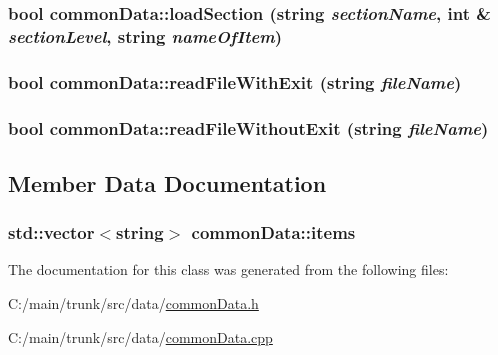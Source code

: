 \label{classcommon_data_aa4d72251ad8be8a2b7f67ded16543844}
\hypertarget{classcommon_data_a3072a95f6f561c067a4193845e423100}{
\subsubsection[{loadSection}]{\setlength{\rightskip}{0pt plus 5cm}bool commonData::loadSection (string {\em sectionName}, \/  int \& {\em sectionLevel}, \/  string {\em nameOfItem})}}
\label{classcommon_data_a3072a95f6f561c067a4193845e423100}
\hypertarget{classcommon_data_a583bb536c664640b9b80b9273189cbfc}{
\subsubsection[{readFileWithExit}]{\setlength{\rightskip}{0pt plus 5cm}bool commonData::readFileWithExit (string {\em fileName})}}
\label{classcommon_data_a583bb536c664640b9b80b9273189cbfc}
\hypertarget{classcommon_data_a7f0be4abb327aa4a77bf3728bd9d41ec}{
\subsubsection[{readFileWithoutExit}]{\setlength{\rightskip}{0pt plus 5cm}bool commonData::readFileWithoutExit (string {\em fileName})}}
\label{classcommon_data_a7f0be4abb327aa4a77bf3728bd9d41ec}


\subsection{Member Data Documentation}
\hypertarget{classcommon_data_a8526d429650c48d9e1b8b1462b78f452}{
\subsubsection[{items}]{\setlength{\rightskip}{0pt plus 5cm}std::vector$<$string$>$ {\bf commonData::items}}}
\label{classcommon_data_a8526d429650c48d9e1b8b1462b78f452}


The documentation for this class was generated from the following files:\begin{DoxyCompactItemize}
\item 
C:/main/trunk/src/data/\hyperlink{common_data_8h}{commonData.h}\item 
C:/main/trunk/src/data/\hyperlink{common_data_8cpp}{commonData.cpp}\end{DoxyCompactItemize}
